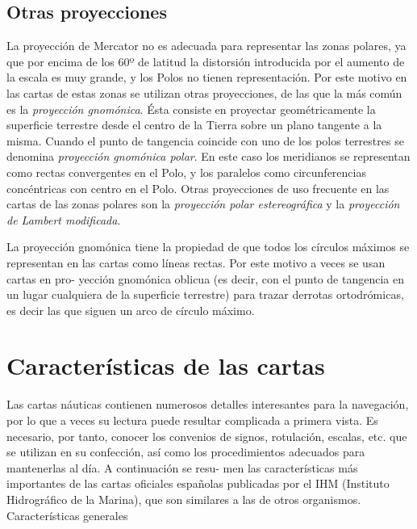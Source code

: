 \subsection{Otras proyecciones}


La proyección de Mercator no es adecuada para representar las zonas polares, ya que por 
encima de los 60º de latitud la distorsión introducida por el aumento de la escala es muy 
grande, y los Polos no tienen representación. Por este motivo en las cartas de estas zonas 
se utilizan otras proyecciones, de las que la más común es la \emph{proyección gnomónica}. Ésta 
consiste en proyectar geométricamente la superficie terrestre desde el centro de la Tierra 
sobre un plano tangente a la misma. Cuando el punto de tangencia coincide con uno de los 
polos terrestres se denomina \emph{proyección gnomónica polar}. En este caso los meridianos se 
representan como rectas convergentes en el Polo, y los paralelos como circunferencias 
concéntricas con centro en el Polo. Otras proyecciones de uso frecuente en las cartas de las 
zonas polares son la \emph{proyección polar estereográfica} y la 
\emph{proyección de Lambert modificada}. 

La proyección gnomónica tiene la propiedad de que todos los círculos máximos se 
representan en las cartas como líneas rectas. Por este motivo a veces se usan cartas en pro- 
yección gnomónica oblicua (es decir, con el punto de tangencia en un lugar cualquiera de 
la superficie terrestre) para trazar derrotas ortodrómicas, es decir las que siguen un arco 
de círculo máximo. 


\section{Características de las cartas}


Las cartas náuticas contienen numerosos detalles interesantes para la navegación, por lo 
que a veces su lectura puede resultar complicada a primera vista. Es necesario, por tanto, 
conocer los convenios de signos, rotulación, escalas, etc. que se utilizan en su confección, 
así como los procedimientos adecuados para mantenerlas al día. A continuación se resu- 
men las características más importantes de las cartas oficiales españolas publicadas por el 
IHM (Instituto Hidrográfico de la Marina), que son similares a las de otros organismos. 
Características generales  

